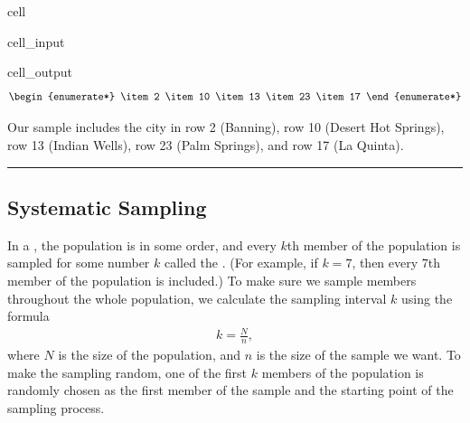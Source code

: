 \documentclass[letterpaper,10pt,english]{jupyterBook}
\begin{document}
\begin{sphinxuseclass}{cell}\begin{sphinxVerbatimInput}

\begin{sphinxuseclass}{cell_input}
\begin{sphinxVerbatim}[commandchars=\\\{\}]
\end{sphinxVerbatim}

\end{sphinxuseclass}\end{sphinxVerbatimInput}
\begin{sphinxVerbatimOutput}

\begin{sphinxuseclass}{cell_output}\begin{equation*}
\begin{split}\begin{enumerate*}
\item 2
\item 10
\item 13
\item 23
\item 17
\end{enumerate*}\end{split}
\end{equation*}
\end{sphinxuseclass}\end{sphinxVerbatimOutput}

\end{sphinxuseclass}
\sphinxAtStartPar
Our sample includes the city in row 2 (Banning), row 10 (Desert Hot Springs), row 13 (Indian Wells), row 23 (Palm Springs), and row 17 (La Quinta).


\bigskip\hrule\bigskip



\subsection{Systematic Sampling}
\label{\detokenize{Ch1 Sampling and Data/1.3 Sampling Techniques:systematic-sampling}}
\sphinxAtStartPar
In a , the population is in some order, and every \(k\)th member of the population is sampled for some number \(k\) called the . (For example, if \(k = 7\), then every \(7\)th member of the population is included.) To make sure we sample members throughout the whole population, we calculate the sampling interval \(k\) using the formula
\begin{equation*}
\begin{split}k = \frac{N}{n}, \end{split}
\end{equation*}
\sphinxAtStartPar
where \(N\) is the size of the population, and \(n\) is the size of the sample we want. To make the sampling random, one of the first \(k\) members of the population is randomly chosen as the first member of the sample and the starting point of the sampling process.
\end{document}
